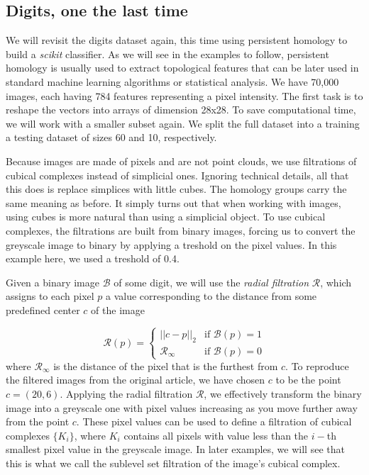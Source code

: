 \subsection{Digits, one the last time}
We will revisit the digits dataset again, this time using persistent homology to build a \textit{scikit} classifier. As we will see in the examples to follow, persistent homology is usually used to extract topological features that can be later used in standard machine learning algorithms or statistical analysis. We have 70,000 images, each having 784 features representing a pixel intensity. The first task is to reshape the vectors into arrays of dimension 28x28. To save computational time, we will work with a smaller subset again. We split the full dataset into a training a testing dataset of sizes 60 and 10, respectively.

Because images are made of pixels and are not point clouds, we use filtrations of cubical complexes instead of simplicial ones. Ignoring technical details, all that this does is replace simplices with little cubes. The homology groups carry the same meaning as before. It simply turns out that when working with images, using cubes is more natural than using a simplicial object. To use cubical complexes, the filtrations are built from binary images, forcing us to convert the greyscale image to binary by applying a treshold on the pixel values. In this example here, we used a treshold of 0.4.

Given a binary image $\mathcal{B}$ of some digit, we will use the \textit{radial filtration} $\mathcal{R}$, which assigns to each pixel $p$ a value corresponding to the distance from some predefined center $c$ of the image

\begin{equation*}
  \mathcal{R}(p) =
  \left\{
    \begin{array}{ll}
      ||c-p||_{2} & \mbox{if } \mathcal{B}(p) = 1 \\
      \mathcal{R}_{\infty} & \mbox{if } \mathcal{B}(p) = 0
    \end{array}
  \right.
\end{equation*}
where $\mathcal{R}_{\infty}$ is the distance of the pixel that is the furthest from $c$. To reproduce the filtered images from the original article, we have chosen $c$ to be the point $c = (20, 6)$. Applying the radial filtration $\mathcal{R}$, we effectively transform the binary image into a greyscale one with pixel values increasing as you move further away from the point $c$. These pixel values can be used to define a filtration of cubical complexes $\{K_{i}\}$, where $K_{i}$ contains all pixels with value less than the $i-$th smallest pixel value in the greyscale image. In later examples, we will see that this is what we call the sublevel set filtration of the image's cubical complex.

